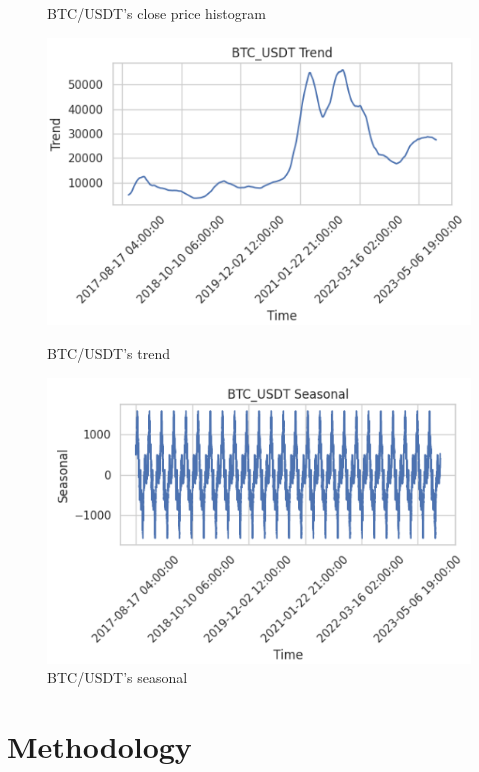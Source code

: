 \documentclass{ieeeojies}
\begin{document}
\begin{figure}[H]
\begin{minipage}{0.23\textwidth}
    \caption{BTC/USDT's close price histogram}
    \label{fig:enter-label}
    \end{minipage}
    \hfill
    \begin{minipage}{0.23\textwidth}
    \centering
    \includegraphics[width=1\textwidth]{bibliography/BTC_trend.png}
    \caption{BTC/USDT's trend}
    \label{fig:enter-label}
    \end{minipage}
    \hfill
    \begin{minipage}{0.23\textwidth}
    \centering
    \includegraphics[width=1\textwidth]{bibliography/BTC_seasonal.png}
    \caption{BTC/USDT's seasonal}
    \label{fig:enter-label}
    \end{minipage}
\end{figure}

\section{Methodology}
\end{document}
